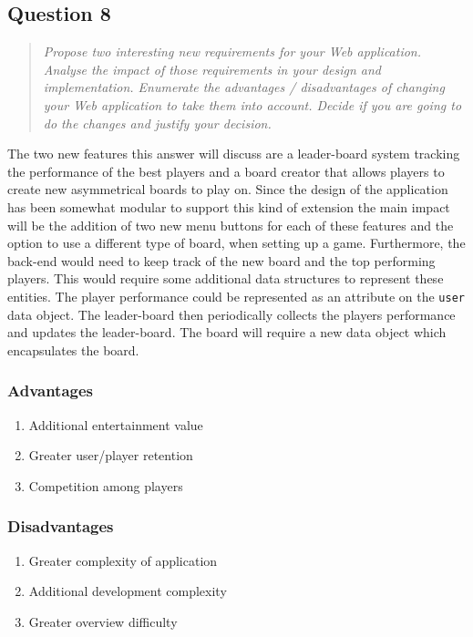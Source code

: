 \documentclass[10pt,a4paper]{report}
\begin{document}
\subsection*{Question 8}
\begin{quote}
\textit{Propose two interesting new requirements for your Web application. Analyse the impact of those requirements in your design and implementation. Enumerate the advantages / disadvantages of changing your Web application to take them into account. Decide if you are going to do the changes and justify your decision.}
\end{quote}

The two new features this answer will discuss are a leader-board system tracking the performance of the best players and a board creator that allows players to create new asymmetrical boards to play on. Since the design of the application has been somewhat modular to support this kind of extension the main impact will be the addition of two new menu buttons for each of these features and the option to use a different type of board, when setting up a game. Furthermore, the back-end would need to keep track of the new board and the top performing players. This would require some additional data structures to represent these entities. The player performance could be represented as an attribute on the \texttt{user} data object. The leader-board then periodically collects the players performance and updates the leader-board. The board will require a new data object which encapsulates the board.

\subsubsection*{Advantages}
\begin{enumerate}
	\item Additional entertainment value
	\item Greater user/player retention
	\item Competition among players
\end{enumerate}

\subsubsection*{Disadvantages}
\begin{enumerate}
	\item Greater complexity of application
	\item Additional development complexity
	\item Greater overview difficulty
\end{enumerate}
\end{document}
